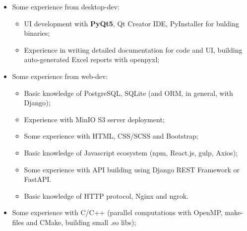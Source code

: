 \documentclass[12pt,a4paper]{moderncv}
\begin{document}
{\begin{itemize}
\begin{itemize}
        \item Advanced work with \textbf{LaTeX} for scientific texts and presentations; \newline
        \item Experience with Matlab/Octave, Mathematica, R; \newline
        \item Basic experience with Tensorflow/Torch frameworks; \newline
    \end{itemize} 
\item Some experience from desktop-dev:\newline
    \begin{itemize}
        \item UI development with \textbf{PyQt5}, Qt Creator IDE, PyInstaller for bulding binaries; \newline
        \item Experience in writing detailed documentation for code and UI, building auto-generated Excel reports with openpyxl; \newline
    \end{itemize}
\item Some experience from web-dev: \newline
    \begin{itemize}
        \item Basic knowledge of PostgreSQL, SQLite (and ORM, in general, with Django); \newline 
        \item Experience with MinIO S3 server deployment; \newline 
        \item Some experience with HTML, CSS/SCSS and Bootstrap; \newline
        \item Basic knowledge of Javascript ecosystem (npm, React.js, gulp, Axios); \newline
        \item Some experience with API building using Django REST Framework or FastAPI.\newline
        \item Basic knowledge of HTTP protocol, Nginx and ngrok.\newline
    \end{itemize}
\item Some experience with C/C++ (parallel computations with OpenMP, make-files and CMake, building small .so libs); \newline \newline
\end{itemize}
}{}{}{}{}
\end{document}
